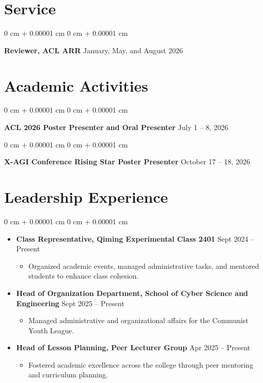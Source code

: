 \documentclass[10pt, letterpaper]{article}
\newenvironment{highlights}{
    \begin{itemize}[
    topsep=0.05 cm,
    parsep=0.05 cm,
    partopsep=0pt,
    itemsep=0pt,
    leftmargin=0 cm + 10pt
    ]
}{
\end{itemize}
} %
\newenvironment{highlightsforbulletentries}{
    \begin{itemize}[
    topsep=0.05 cm,
    parsep=0.05 cm,
    partopsep=0pt,
    itemsep=0pt,
    leftmargin=10pt
    ]
}{
\end{itemize}
} %
\newenvironment{onecolentry}{
    \begin{adjustwidth}{
        0 cm + 0.00001 cm
    }{
        0 cm + 0.00001 cm
    }
}{
\end{adjustwidth}
} %
\begin{document}
\section{Service}

\begin{onecolentry}
\textbf{Reviewer, ACL ARR} \hfill January, May, and August 2026
\end{onecolentry}

\section{Academic Activities}

\begin{onecolentry}
\textbf{ACL 2026 Poster Presenter and Oral Presenter} \hfill July 1 -- 8, 2026
\end{onecolentry}

\begin{onecolentry}
\textbf{X-AGI Conference Rising Star Poster Presenter} \hfill October 17 -- 18, 2026
\end{onecolentry}

\section{Leadership Experience}

\begin{onecolentry}
    \begin{highlights}
        \item \textbf{Class Representative, Qiming Experimental Class 2401} \hfill Sept 2024 -- Present
        \begin{highlightsforbulletentries}
            \item Organized academic events, managed administrative tasks, and mentored students to enhance class cohesion.
        \end{highlightsforbulletentries}
        
        \item \textbf{Head of Organization Department, School of Cyber Science and Engineering} \hfill Sept 2025 -- Present
        \begin{highlightsforbulletentries}
            \item Managed administrative and organizational affairs for the Communist Youth League.
        \end{highlightsforbulletentries}

        \item \textbf{Head of Lesson Planning, Peer Lecturer Group} \hfill Apr 2025 -- Present
        \begin{highlightsforbulletentries}
            \item Fostered academic excellence across the college through peer mentoring and curriculum planning.
        \end{highlightsforbulletentries}
    \end{highlights}
\end{onecolentry}
\end{document}
